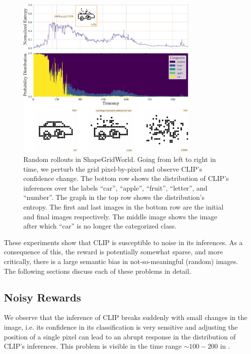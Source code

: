 \begin{figure}[h]
    \centering
    \includegraphics[width=0.8\textwidth]{images/sparse_rewards.pdf}
    \caption[Random rollouts in ShapeGridWorld.]{Random rollouts in ShapeGridWorld. Going from left to right in time, we perturb the grid pixel-by-pixel and observe CLIP's confidence change. The bottom row shows the distribution of CLIP's inferences over the labels ``car'', ``apple'', ``fruit'', ``letter'', and ``number''. The graph in the top row shows the distribution's entropy. The first and last images in the bottom row are the initial and final images respectively.
    The middle image shows the image after which ``car'' is no longer the categorized class.}
    \label{fig:random-rollout}
\end{figure}

These experiments show that CLIP is susceptible to noise in its inferences.
As a consequence of this, the reward is potentially somewhat sparse, and more critically, there is a large semantic bias in not-so-meaningful (random) images.
The following sections discuss each of these problems in detail.

\subsection{Noisy Rewards} %
\label{sec:noisy-rewards}
We observe that the inference of CLIP breaks suddenly with small changes in the image, i.e. its confidence in its classification is very sensitive and adjusting the position of a single pixel can lead to an abrupt response in the distribution of CLIP's inferences.
This problem is visible in the time range \(\sim 100 - 200\) in .

